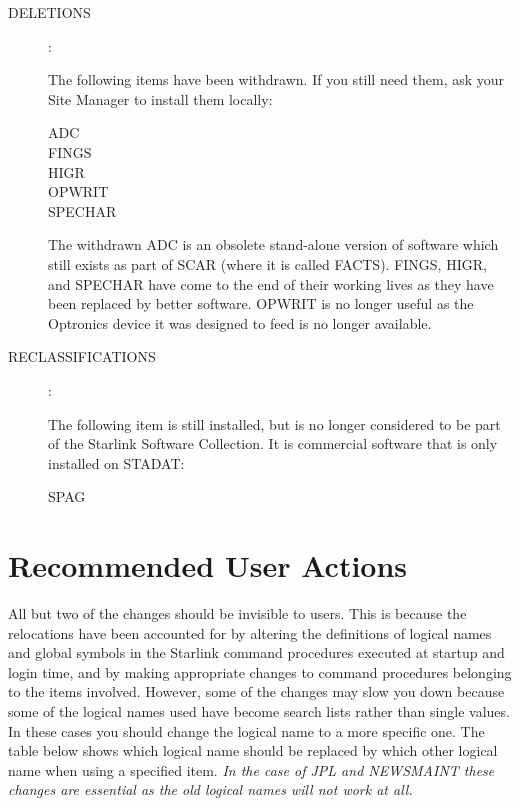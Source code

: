 \begin{description}
\begin{description}
\item [DELETIONS] :

The following items have been withdrawn.
If you still need them, ask your Site Manager to install them locally:
\begin{description}
\begin{description}
\item [ADC]
\item [FINGS]
\item [HIGR]
\item [OPWRIT]
\item [SPECHAR]
\end{description}
\end{description}
The withdrawn ADC is an obsolete stand-alone version of software which still
exists as part of SCAR (where it is called FACTS).
FINGS, HIGR, and SPECHAR have come to the end of their working lives as they
have been replaced by better software.
OPWRIT is no longer useful as the Optronics device it was designed to feed is
no longer available.

\item [RECLASSIFICATIONS] :

The following item is still installed, but is no longer considered to be part
of the Starlink Software Collection.
It is commercial software that is only installed on STADAT:
\begin{description}
\begin{description}
\item [SPAG]
\end{description}
\end{description}

\end{description}
\end{description}

\section{Recommended User Actions}

All but two of the changes should be invisible to users.
This is because the relocations have been accounted for by altering the
definitions of logical names and global symbols in the Starlink command
procedures executed at startup and login time, and by making appropriate
changes to command procedures belonging to the items involved.
However, some of the changes may slow you down because some of the logical
names used have become search lists rather than single values.
In these cases you should change the logical name to a more specific one.
The table below shows which logical name should be replaced by which other
logical name when using a specified item.
{\em In the case of JPL and NEWSMAINT these changes are essential as the old
logical names will not work at all.}

